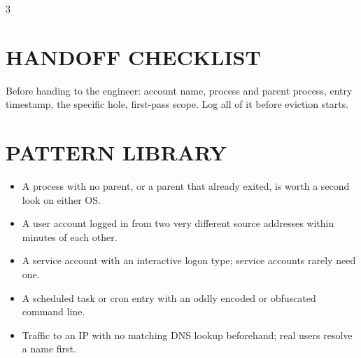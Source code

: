 \documentclass[7pt,landscape]{article}
\begin{document}
\begin{multicols*}{3}
\section{HANDOFF CHECKLIST}
Before handing to the engineer: account name, process and parent process, entry timestamp, the specific hole, first-pass scope. Log all of it before eviction starts.

\section{PATTERN LIBRARY}
\begin{itemize}
    \item A process with no parent, or a parent that already exited, is worth a second look on either OS.
    \item A user account logged in from two very different source addresses within minutes of each other.
    \item A service account with an interactive logon type; service accounts rarely need one.
    \item A scheduled task or cron entry with an oddly encoded or obfuscated command line.
    \item Traffic to an IP with no matching DNS lookup beforehand; real users resolve a name first.
\end{itemize}

\end{multicols*}
\end{document}
